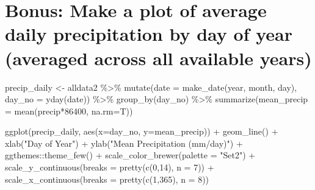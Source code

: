 \documentclass[
]{book}
\newenvironment{Shaded}{\begin{snugshade}}{\end{snugshade}}
\newcommand{\AttributeTok}[1]{\textcolor[rgb]{0.77,0.63,0.00}{#1}}
\newcommand{\DecValTok}[1]{\textcolor[rgb]{0.00,0.00,0.81}{#1}}
\newcommand{\FunctionTok}[1]{\textcolor[rgb]{0.00,0.00,0.00}{#1}}
\newcommand{\NormalTok}[1]{#1}
\newcommand{\OtherTok}[1]{\textcolor[rgb]{0.56,0.35,0.01}{#1}}
\newcommand{\SpecialCharTok}[1]{\textcolor[rgb]{0.00,0.00,0.00}{#1}}
\newcommand{\StringTok}[1]{\textcolor[rgb]{0.31,0.60,0.02}{#1}}
\begin{document}
\hypertarget{bonus-make-a-plot-of-average-daily-precipitation-by-day-of-year-averaged-across-all-available-years}{%
\section{Bonus: Make a plot of average daily precipitation by day of year (averaged across all available years)}\label{bonus-make-a-plot-of-average-daily-precipitation-by-day-of-year-averaged-across-all-available-years}}

\begin{Shaded}
\begin{Highlighting}[]
\NormalTok{precip\_daily }\OtherTok{\textless{}{-}}\NormalTok{ alldata2 }\SpecialCharTok{\%\textgreater{}\%}
  \FunctionTok{mutate}\NormalTok{(}\AttributeTok{date =} \FunctionTok{make\_date}\NormalTok{(year, month, day),}
                \AttributeTok{day\_no =} \FunctionTok{yday}\NormalTok{(date)) }\SpecialCharTok{\%\textgreater{}\%}
  \FunctionTok{group\_by}\NormalTok{(day\_no) }\SpecialCharTok{\%\textgreater{}\%}
  \FunctionTok{summarize}\NormalTok{(}\AttributeTok{mean\_precip =} \FunctionTok{mean}\NormalTok{(}\StringTok{\textasciigrave{}}\AttributeTok{precip}\StringTok{\textasciigrave{}}\SpecialCharTok{*}\DecValTok{86400}\NormalTok{, }\AttributeTok{na.rm=}\NormalTok{T))}

\FunctionTok{ggplot}\NormalTok{(precip\_daily, }\FunctionTok{aes}\NormalTok{(}\AttributeTok{x=}\NormalTok{day\_no, }\AttributeTok{y=}\NormalTok{mean\_precip)) }\SpecialCharTok{+} 
      \FunctionTok{geom\_line}\NormalTok{() }\SpecialCharTok{+}
      \FunctionTok{xlab}\NormalTok{(}\StringTok{"Day of Year"}\NormalTok{) }\SpecialCharTok{+} \FunctionTok{ylab}\NormalTok{(}\StringTok{"Mean Precipitation (mm/day)"}\NormalTok{) }\SpecialCharTok{+}
\NormalTok{      ggthemes}\SpecialCharTok{::}\FunctionTok{theme\_few}\NormalTok{() }\SpecialCharTok{+} 
      \FunctionTok{scale\_color\_brewer}\NormalTok{(}\AttributeTok{palette =} \StringTok{"Set2"}\NormalTok{) }\SpecialCharTok{+} 
      \FunctionTok{scale\_y\_continuous}\NormalTok{(}\AttributeTok{breaks =} \FunctionTok{pretty}\NormalTok{(}\FunctionTok{c}\NormalTok{(}\DecValTok{0}\NormalTok{,}\DecValTok{14}\NormalTok{), }\AttributeTok{n =} \DecValTok{7}\NormalTok{)) }\SpecialCharTok{+}
      \FunctionTok{scale\_x\_continuous}\NormalTok{(}\AttributeTok{breaks =} \FunctionTok{pretty}\NormalTok{(}\FunctionTok{c}\NormalTok{(}\DecValTok{1}\NormalTok{,}\DecValTok{365}\NormalTok{), }\AttributeTok{n =} \DecValTok{8}\NormalTok{))}
\end{Highlighting}
\end{Shaded}
\end{document}
